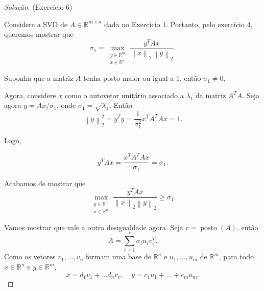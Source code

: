 \documentclass[a4paper,10pt]{article}
\newenvironment{solution}
  {\begin{proof}[Solução]}
  {\end{proof}}
\newcommand{\norm}[1]{\left\lVert#1\right\rVert}
\DeclareMathOperator{\posto}{posto}
\begin{document}
  \begin{solution}{(Exercício 6)}

    Considere a SVD de $A\in \mathbb{R}^{m\times n}$ dada no Exercício 1. Portanto,
    pelo exercício 4, queremos mostrar que
    \begin{equation*}
      \sigma_1 = \max_{\substack{y \in \mathbb{R}^m \\ x \in \mathbb{R}^n}}
      \frac{y^TAx}{\norm{x}_2\norm{y}_2}.
    \end{equation*}

    Suponha que a matriz $A$ tenha posto maior ou igual a 1, então $\sigma_1 \neq 0$.

    Agora, considere $x$ como o autovetor unitário associado a $\lambda_1$ da matriz $A^TA$.
    Seja agora $y = Ax/\sigma_1$, onde $\sigma_1 = \sqrt{\lambda_1}$. Então
    \begin{equation*}
      \norm{y}_2^2 = y^Ty = \frac{1}{\sigma_1^2} x^TA^TAx = 1.
    \end{equation*}

    Logo,

    \begin{equation*}
      y^TAx = \frac{x^TA^TAx}{\sigma_1} = \sigma_1.
    \end{equation*}

    Acabamos de mostrar que
    \begin{equation*}
      \max_{\substack{y \in \mathbb{R}^m \\ x \in \mathbb{R}^n}}
      \frac{y^TAx}{\norm{x}_2\norm{y}_2} \geq \sigma_1.
    \end{equation*}

    Vamos mostrar que vale a outra desigualdade agora. Seja $r = \posto(A)$,
    então
    \begin{equation*}
      A = \sum_{i=1}^{r}\sigma_iu_iv_i^T.
    \end{equation*}
    Como os vetores $v_1, \dots, v_n$ formam uma base de $\mathbb{R}^{n}$ e $u_1, \dots, u_m$ de $\mathbb{R}^m$,
    para todo $x \in \mathbb{R}^n$ e $y \in \mathbb{R}^m$,
    \begin{equation*}
      x = d_1 v_1 + \dots d_n v_v, \quad y = c_1 u_1 + \dots + c_m u_m.
    \end{equation*}


\end{solution}
\end{document}
